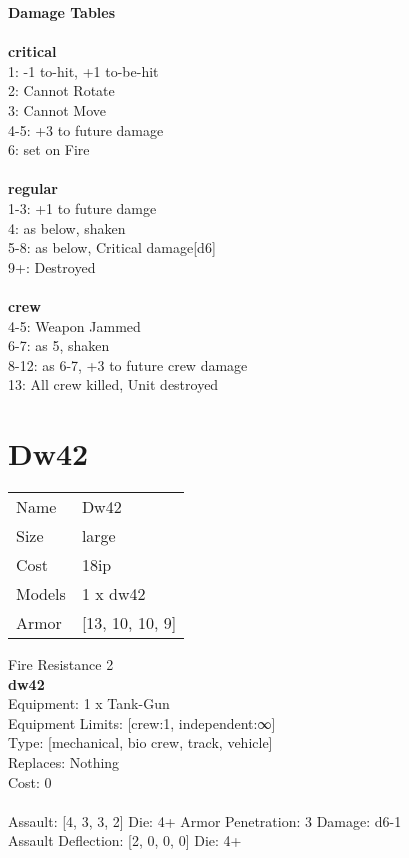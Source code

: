 {\bf Damage Tables} \\
\ \\ {\bf critical } \\
1: -1 to-hit, +1 to-be-hit \\
2: Cannot Rotate \\
3: Cannot Move \\
4-5: +3 to future damage \\
6: set on Fire \\
\ \\ {\bf regular } \\
1-3: +1 to future damge \\
4: as below, shaken \\
5-8: as below, Critical damage[d6] \\
9+: Destroyed \\
\ \\ {\bf crew } \\
4-5: Weapon Jammed \\
6-7: as 5, shaken \\
8-12: as 6-7, +3 to future crew damage \\
13: All crew killed, Unit destroyed \\










\pagebreak\pagebreak

\section{ Dw42 }

\begin{tabular}{ll}
  Name & Dw42 \\
  Size & large\\
  Cost & 18ip\\
  Models & 1 x dw42\\
  Armor & [13, 10, 10, 9]\\
\end{tabular}

\noindent Fire Resistance 2\\ 


{\bf dw42 } \\
Equipment: 1 x Tank-Gun \\
Equipment Limits: [crew:1, independent:∞] \\
Type: [mechanical, bio crew, track, vehicle] \\
Replaces: Nothing \\
Cost: 0\\
\ \\
Assault: [4, 3, 3, 2] Die: 4+ Armor Penetration: 3 Damage: d6-1 \\
Assault Deflection: [2, 0, 0, 0] Die: 4+\\
\indent  
\ \\

